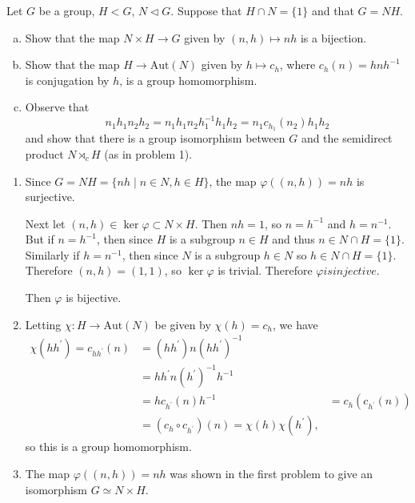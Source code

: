 \documentclass{article}
\newcounter{Problem}
\newenvironment{Problem}{\begin{Exercise}[name={Problem},
                                          counter={Problem}]}
                        {\end{Exercise}}
\begin{document}
\begin{Problem}
Let $G$ be a group, $H < G$, $N \triangleleft G$. Suppose that 
$H \cap N = \{ 1 \}$ and that $G = NH$.
\begin{enumerate}[(a)]
  \item{Show that the map $N \times H \to G$ given by
        $(n, h) \mapsto nh$ is a bijection.}
  \item{Show that the map $H \to \mathrm{Aut}(N)$ given by
      $h \mapsto c_h$, where $c_h(n) = h n h^{-1}$ is conjugation by
      $h$, is a group homomorphism.}
  \item{Observe that 
        $$
        n_1 h_1 n_2 h_2 
      = n_1 h_1 n_2 h_1^{-1} h_1 h_2
      = n_1 c_{h_1}(n_2) h_1 h_2
        $$
        and show that there is a group isomorphism between $G$ and the
        semidirect product $N \rtimes_c H$ (as in problem 1).}
\end{enumerate}
\end{Problem}

\begin{Answer}
\begin{enumerate}
  \item{Since $G = NH = \{ nh \mid n \in N, h \in H \}$, 
        the map $\varphi((n, h)) = nh$ is surjective.

        Next let $(n, h) \in \ker \varphi \subset N \times H$. Then 
        $nh = 1$, so $n = h^{-1}$ and $h = n^{-1}$. But if
        $n = h^{-1}$, then since $H$ is a subgroup $n \in H$
        and thus $n \in N \cap H = \{1\}$. 
        Similarly if $h = n^{-1}$, then
        since $N$ is a subgroup $h \in N$ so $h \in N \cap H = \{1\}$.
        Therefore $(n, h) = (1, 1)$, so $\ker \varphi$ is trivial.
        Therefore $\varphi is injective$.

        Then $\varphi$ is bijective.
       }
  \item{
    Letting $\chi : H \to \mathrm{Aut}(N)$ be given by
    $\chi(h) = c_h$, we have
    \begin{align*}
     \chi(h h^\prime) =  c_{h h^\prime}(n)
  &= (h h^\prime) n (h h^\prime)^{-1} \\
  &= h h^\prime n (h^\prime)^{-1} h^{-1} \\
  &= h c_{h^\prime}(n) h^{-1}
  &= c_h (c_{h^\prime} (n)) \\
  &= (c_h \circ c_{h^\prime})(n) = \chi(h) \chi(h^\prime),
    \end{align*}
    so this is a group homomorphism.
  }
  \item{
    The map $\varphi((n, h)) = nh$ was shown in the first problem to
    give an isomorphism $G \simeq N \times H$.

  }
\end{enumerate}
\end{Answer}
\end{document}
